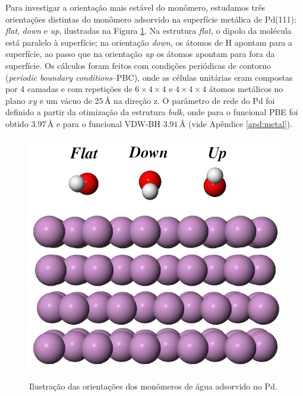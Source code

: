 Para investigar a orientação mais estável do monômero, estudamos três orientações distintas do monômero adsorvido na superfície metálica de Pd(111): \textit{flat}, \textit{down} e \textit{up}, ilustradas na Figura \ref{fig:monomer}. Na estrutura \textit{flat}, o dipolo da molécula está paralelo à superfície; na orientação \textit{down}, os átomos de H apontam para a superfície, ao passo que na orientação \textit{up} os átomos apontam para fora da superfície. Os cálculos foram feitos com condições periódicas de contorno (\textit{periodic boundary conditions}--PBC), onde as células unitárias eram compostas por 4 camadas e com repetições de $ 6\times4\times4$ e $ 4\times4\times4$ átomos metálicos no plano $ xy $ e um vácuo de $ 25\,\si{\angstrom}$ na direção z. O parâmetro de rede do Pd foi definido a partir da otimização da estrutura \textit{bulk}, onde para o funcional PBE foi obtido $3.97\,\si{\angstrom} $ e para o funcional VDW-BH $ 3.91\,\si{\angstrom} $ (vide Apêndice \ref{apd:metal}).
\begin{figure}[t!]
	\centering
	\caption{Ilustração das orientações dos monômeros de água adsorvido no Pd.}
	\includegraphics[scale=0.3]{figs/monomer.png}
	\label{fig:monomer}
\end{figure}  


